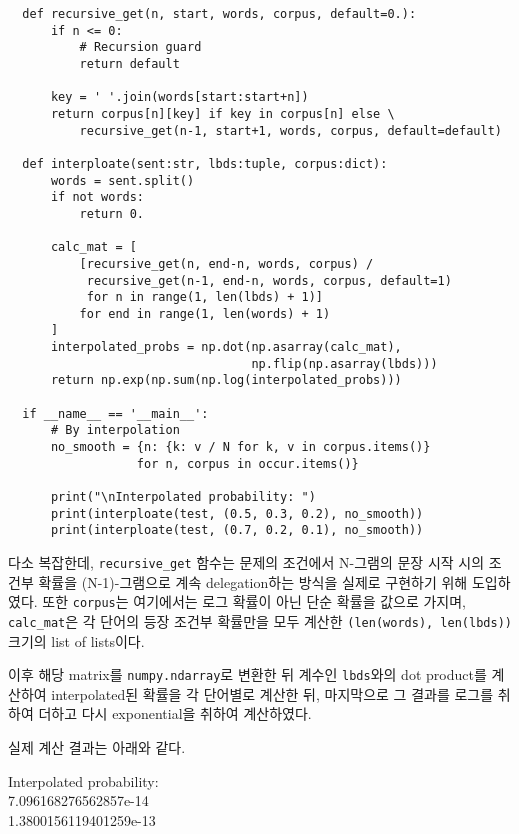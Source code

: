 \documentclass[a4paper,11pt]{scrartcl}
\begin{document}
\begin{lstlisting}
  def recursive_get(n, start, words, corpus, default=0.):
      if n <= 0:
          # Recursion guard
          return default

      key = ' '.join(words[start:start+n])
      return corpus[n][key] if key in corpus[n] else \
          recursive_get(n-1, start+1, words, corpus, default=default)

  def interploate(sent:str, lbds:tuple, corpus:dict):
      words = sent.split()
      if not words:
          return 0.

      calc_mat = [
          [recursive_get(n, end-n, words, corpus) /
           recursive_get(n-1, end-n, words, corpus, default=1)
           for n in range(1, len(lbds) + 1)]
          for end in range(1, len(words) + 1)
      ]
      interpolated_probs = np.dot(np.asarray(calc_mat),
                                  np.flip(np.asarray(lbds)))
      return np.exp(np.sum(np.log(interpolated_probs)))

  if __name__ == '__main__':
      # By interpolation
      no_smooth = {n: {k: v / N for k, v in corpus.items()}
                  for n, corpus in occur.items()}

      print("\nInterpolated probability: ")
      print(interploate(test, (0.5, 0.3, 0.2), no_smooth))
      print(interploate(test, (0.7, 0.2, 0.1), no_smooth))
\end{lstlisting}

다소 복잡한데, \lstinline{recursive_get} 함수는 문제의 조건에서 N-그램의 문장 시작 시의 조건부 확률을 (N-1)-그램으로 계속 delegation하는 방식을 실제로 구현하기 위해 도입하였다. 또한 \lstinline{corpus}는 여기에서는 로그 확률이 아닌 단순 확률을 값으로 가지며, \lstinline{calc_mat}은 각 단어의 등장 조건부 확률만을 모두 계산한 \lstinline{(len(words), len(lbds))} 크기의 list of lists이다.

이후 해당 matrix를 \lstinline{numpy.ndarray}로 변환한 뒤 계수인 \lstinline{lbds}와의 dot product를 계산하여 interpolated된 확률을 각 단어별로 계산한 뒤, 마지막으로 그 결과를 로그를 취하여 더하고 다시 exponential을 취하여 계산하였다.

실제 계산 결과는 아래와 같다.

\par\medskip
\begin{longfbox}[margin-left=1em]
  \ttfamily
  \noindent Interpolated probability: \\
  7.096168276562857e-14 \\
  1.3800156119401259e-13
\end{longfbox}
\end{document}
